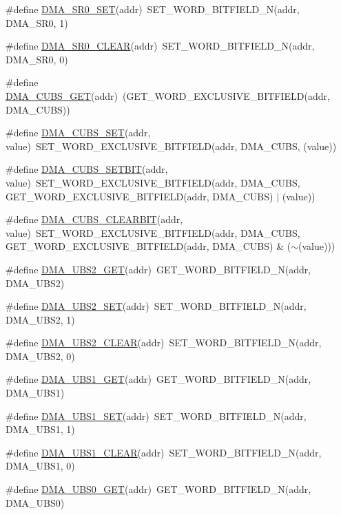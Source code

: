\begin{DoxyCompactItemize}
\item 
\#define \hyperlink{a00548_a1e6689ee1e23c15db22d1f9c0498da6c}{DMA\_\-SR0\_\-SET}(addr)~SET\_\-WORD\_\-BITFIELD\_\-N(addr, DMA\_\-SR0, 1)
\item 
\#define \hyperlink{a00548_a6ed9c3f99fc66201bac0fc50d6efe249}{DMA\_\-SR0\_\-CLEAR}(addr)~SET\_\-WORD\_\-BITFIELD\_\-N(addr, DMA\_\-SR0, 0)
\item 
\#define \hyperlink{a00548_a729523d4e3b2ca9eaf8a0ed7faf26c9d}{DMA\_\-CUBS\_\-GET}(addr)~(GET\_\-WORD\_\-EXCLUSIVE\_\-BITFIELD(addr, DMA\_\-CUBS))
\item 
\#define \hyperlink{a00548_a6790a7f19d06b4e196652bdee042c3c8}{DMA\_\-CUBS\_\-SET}(addr, value)~SET\_\-WORD\_\-EXCLUSIVE\_\-BITFIELD(addr, DMA\_\-CUBS, (value))
\item 
\#define \hyperlink{a00548_aa88b225f0c11d08955defee38a8b453e}{DMA\_\-CUBS\_\-SETBIT}(addr, value)~SET\_\-WORD\_\-EXCLUSIVE\_\-BITFIELD(addr, DMA\_\-CUBS, GET\_\-WORD\_\-EXCLUSIVE\_\-BITFIELD(addr, DMA\_\-CUBS) $|$ (value))
\item 
\#define \hyperlink{a00548_aa96e108383b17ccb560d36bf9e3693c4}{DMA\_\-CUBS\_\-CLEARBIT}(addr, value)~SET\_\-WORD\_\-EXCLUSIVE\_\-BITFIELD(addr, DMA\_\-CUBS, GET\_\-WORD\_\-EXCLUSIVE\_\-BITFIELD(addr, DMA\_\-CUBS) \& ($\sim$(value)))
\item 
\#define \hyperlink{a00548_aca560f96ccd5a71c7d17c4c6bd98b426}{DMA\_\-UBS2\_\-GET}(addr)~GET\_\-WORD\_\-BITFIELD\_\-N(addr, DMA\_\-UBS2)
\item 
\#define \hyperlink{a00548_adfd9f0e8ea6fa2bc57ac05a5bd9010d0}{DMA\_\-UBS2\_\-SET}(addr)~SET\_\-WORD\_\-BITFIELD\_\-N(addr, DMA\_\-UBS2, 1)
\item 
\#define \hyperlink{a00548_ad4b0a2f591848dc34930a15a5da579db}{DMA\_\-UBS2\_\-CLEAR}(addr)~SET\_\-WORD\_\-BITFIELD\_\-N(addr, DMA\_\-UBS2, 0)
\item 
\#define \hyperlink{a00548_ad97649b40805962ebf3746e2c6a6e6af}{DMA\_\-UBS1\_\-GET}(addr)~GET\_\-WORD\_\-BITFIELD\_\-N(addr, DMA\_\-UBS1)
\item 
\#define \hyperlink{a00548_a7a0a7628f63721dc31523f7eb190a0c5}{DMA\_\-UBS1\_\-SET}(addr)~SET\_\-WORD\_\-BITFIELD\_\-N(addr, DMA\_\-UBS1, 1)
\item 
\#define \hyperlink{a00548_ab677f8c07aac916c791e5dcd4089d98d}{DMA\_\-UBS1\_\-CLEAR}(addr)~SET\_\-WORD\_\-BITFIELD\_\-N(addr, DMA\_\-UBS1, 0)
\item 
\#define \hyperlink{a00548_addcdeeb513c806d7788d37dcaada5111}{DMA\_\-UBS0\_\-GET}(addr)~GET\_\-WORD\_\-BITFIELD\_\-N(addr, DMA\_\-UBS0)

\end{DoxyCompactItemize}
